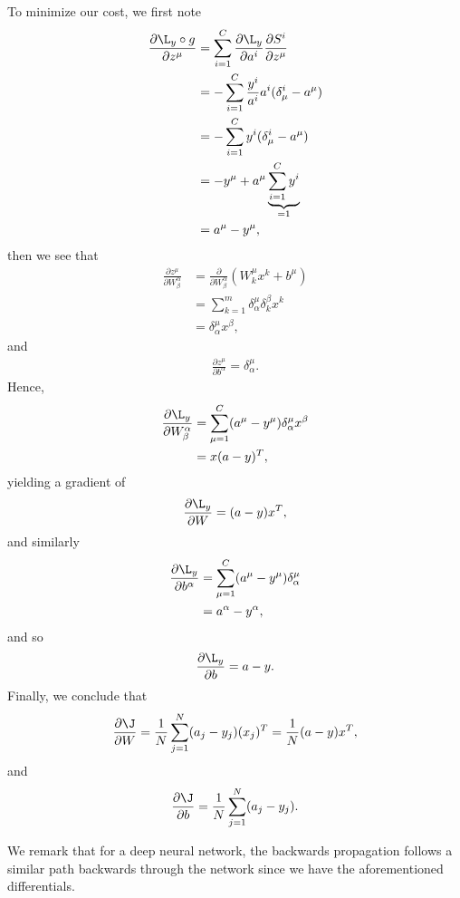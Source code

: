 To minimize our cost, we first note
\begin{align*}
	\frac{\partial\L_y\circ g}{\partial z^\mu}&=\sum_{i=1}^C\frac{\partial\L_y}{\partial a^i}\frac{\partial S^i}{\partial z^\mu}\\
	&=-\sum_{i=1}^C\frac{y^i}{a^i}a^i(\delta^i_\mu-a^\mu)\\
	&=-\sum_{i=1}^Cy^i(\delta^i_\mu-a^\mu)\\
	&=-y^\mu+a^\mu\underbrace{\sum_{i=1}^Cy^i}_{=1}\\
	&=a^\mu-y^\mu,
\end{align*}
then we see that
\begin{align*}
	\frac{\partial z^\mu}{\partial W^\alpha_\beta}&=\frac{\partial}{\partial W^\alpha_\beta}(W^\mu_kx^k+b^\mu)\\
	&=\sum_{k=1}^m\delta^\mu_\alpha\delta_k^\beta x^k\\
	&=\delta^\mu_\alpha x^\beta,
\end{align*}
and
\begin{align*}
	\frac{\partial z^\mu}{\partial b^\alpha}=\delta^\mu_\alpha.
\end{align*}
Hence,
\begin{align*}
	\frac{\partial\L_y}{\partial W^\alpha_\beta}&=\sum_{\mu=1}^C(a^\mu-y^\mu)\delta_\alpha^\mu x^\beta\\
	&=x(a-y)^T,
\end{align*}
yielding a gradient of
$$\frac{\partial\L_y}{\partial W}=(a-y)x^T,$$
and similarly
\begin{align*}
	\frac{\partial\L_y}{\partial b^\alpha}&=\sum_{\mu=1}^C(a^\mu-y^\mu)\delta^\mu_\alpha\\
	&=a^\alpha-y^\alpha,
\end{align*}
and so
$$\frac{\partial\L_y}{\partial b}=a-y.$$
Finally, we conclude that
$$\frac{\partial\J}{\partial W}=\frac{1}{N}\sum_{j=1}^N(a_j-y_j)(x_j)^T=\frac{1}{N}(a-y)x^T,$$
and
$$\frac{\partial\J}{\partial b}=\frac{1}{N}\sum_{j=1}^N(a_j-y_j).$$

We remark that for a deep neural network, the backwards propagation follows a similar path backwards through the network since we have the aforementioned differentials.



















